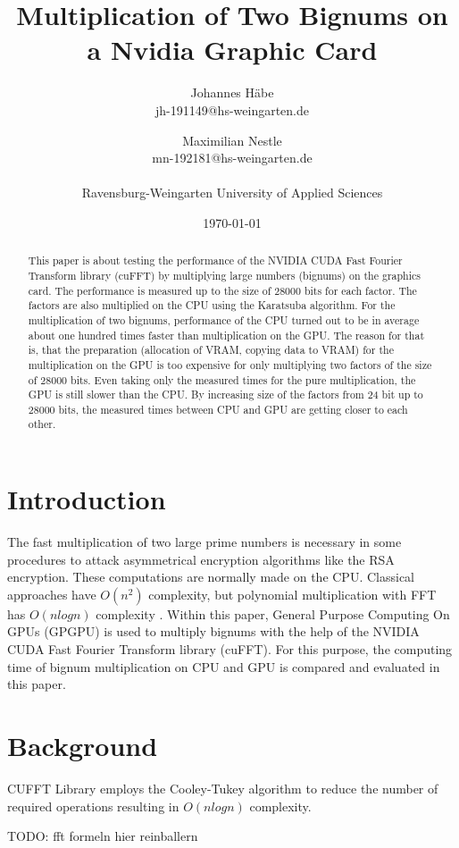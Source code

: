 \documentclass[12pt,a4paper]{article}
\title{Multiplication of Two Bignums on a Nvidia Graphic Card}
\author{Johannes H\"abe  \\
	jh-191149@hs-weingarten.de
	\and 
	Maximilian Nestle \\
	mn-192181@hs-weingarten.de \\\\
	Ravensburg-Weingarten University of Applied Sciences
	}
\date{\today}
\begin{document}
\maketitle
%
\begin{abstract}
This paper is about testing the performance of the NVIDIA CUDA Fast Fourier Transform library (cuFFT) by multiplying large numbers (bignums) on the graphics card. The performance is measured up to the size of 28000 bits for each factor. The factors are also multiplied on the CPU using the Karatsuba algorithm. For the multiplication of two bignums, performance of the CPU turned out to be in average about one hundred times faster than multiplication on the GPU. The reason for that is, that the preparation (allocation of VRAM, copying data to VRAM) for the multiplication on the GPU is too expensive for only multiplying two factors of the size of 28000 bits. Even taking only the measured times for the pure multiplication, the GPU is still slower than the CPU. By increasing size of the factors from 24 bit up to 28000 bits, the measured times between CPU and GPU are getting closer to each other.
\end{abstract}

\section{Introduction}
The fast multiplication of two large prime numbers is necessary in some procedures to attack asymmetrical encryption algorithms like the RSA encryption. These computations are normally made on the CPU. Classical approaches have $O(n^2)$ complexity, but polynomial multiplication with FFT has $O(nlogn)$ complexity \cite{bantikyan2014big}. Within this paper, General Purpose Computing On GPUs (GPGPU) is used to multiply bignums with the help of the NVIDIA CUDA Fast Fourier Transform library (cuFFT). For this purpose, the computing time of bignum multiplication on CPU and GPU is compared and evaluated in this paper.

\section{Background}
CUFFT Library employs the Cooley-Tukey algorithm to reduce the number of required operations \cite{nvidia2012cuda} resulting in $O(nlogn)$ complexity. 

TODO: fft formeln hier reinballern
\end{document}

